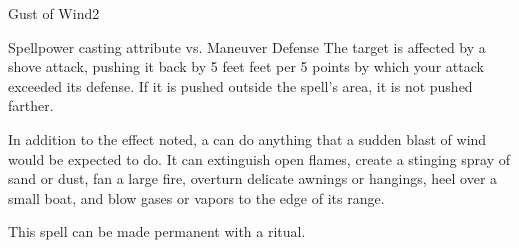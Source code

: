 \begin{spellsection}{Gust of Wind}{2}
    \begin{spellheader}
    \end{spellheader}
    \begin{spellcontent}
        \begin{spelltargetinginfo}
        \end{spelltargetinginfo}
        \begin{spelleffects}
            \begin{spellattack}{Spellpower \add casting attribute vs. Maneuver Defense}
                \spellsuccess The target is affected by a shove attack, pushing it back by 5 feet  feet per 5 points by which your attack exceeded its defense. If it is pushed outside the spell's area, it is not pushed farther.
            \end{spellattack}
        \end{spelleffects}
    \end{spellcontent}
    \begin{spellfooter}
        \spellnotes In addition to the effect noted, a  can do anything that a sudden blast of wind would be expected to do. It can extinguish open flames, create a stinging spray of sand or dust, fan a large fire, overturn delicate awnings or hangings, heel over a small boat, and blow gases or vapors to the edge of its range.

        This spell can be made permanent with a  ritual.
        \miscastexplode
    \end{spellfooter}
\end{spellsection}


